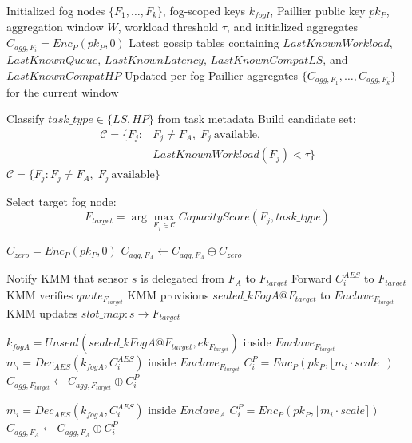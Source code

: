 \documentclass[conference]{IEEEtran}
\begin{document}
\begin{algorithm}
\caption{Runtime TEE-Assisted Paillier Slot Aggregation with Load-Balanced Delegation}
\label{alg:runtime_delegation}
\begin{algorithmic}[1]
\REQUIRE Initialized fog nodes $\{F_1,\ldots,F_k\}$, fog-scoped keys $k_{fogI}$, Paillier public key $pk_P$, aggregation window $W$, workload threshold $\tau$, and initialized aggregates $C_{agg,F_i}=Enc_P(pk_P,0)$
\REQUIRE Latest gossip tables containing $LastKnownWorkload$, $LastKnownQueue$, $LastKnownLatency$, $LastKnownCompatLS$, and $LastKnownCompatHP$
\ENSURE Updated per-fog Paillier aggregates $\{C_{agg,F_1},\ldots,C_{agg,F_k}\}$ for the current window

        \STATE Classify $task\_type \in \{LS,HP\}$ from task metadata
        \STATE Build candidate set:
        \[
        \begin{aligned}
        \mathcal{C}=\{F_j: & F_j\neq F_A,\;F_j\ \text{available},\\
        & LastKnownWorkload(F_j)<\tau\}
        \end{aligned}
        \]
            \STATE $\mathcal{C}=\{F_j:F_j\neq F_A,\;F_j\ \text{available}\}$
        \ENDIF

        \STATE Select target fog node:
        \[
        F_{target}=\arg\max_{F_j\in\mathcal{C}} CapacityScore(F_j,task\_type)
        \]

            \STATE $C_{zero}=Enc_P(pk_P,0)$
            \STATE $C_{agg,F_A}\leftarrow C_{agg,F_A}\oplus C_{zero}$
        \ENDIF

        \STATE Notify KMM that sensor $s$ is delegated from $F_A$ to $F_{target}$
        \STATE Forward $C_i^{AES}$ to $F_{target}$
        \STATE KMM verifies $quote_{F_{target}}$
        \STATE KMM provisions $sealed\_kFogA@F_{target}$ to $Enclave_{F_{target}}$
        \STATE KMM updates $slot\_map:s\rightarrow F_{target}$

        \STATE $k_{fogA}=Unseal(sealed\_kFogA@F_{target},ek_{F_{target}})$ inside $Enclave_{F_{target}}$
        \STATE $m_i=Dec_{AES}(k_{fogA},C_i^{AES})$ inside $Enclave_{F_{target}}$
        \STATE $C_i^P=Enc_P(pk_P,\lfloor m_i\cdot scale\rceil)$
        \STATE $C_{agg,F_{target}}\leftarrow C_{agg,F_{target}}\oplus C_i^P$

    \ELSE
        \STATE $m_i=Dec_{AES}(k_{fogA},C_i^{AES})$ inside $Enclave_A$
        \STATE $C_i^P=Enc_P(pk_P,\lfloor m_i\cdot scale\rceil)$
        \STATE $C_{agg,F_A}\leftarrow C_{agg,F_A}\oplus C_i^P$
    \ENDIF
\ENDFOR

\end{algorithmic}
\end{algorithm}
\end{document}

